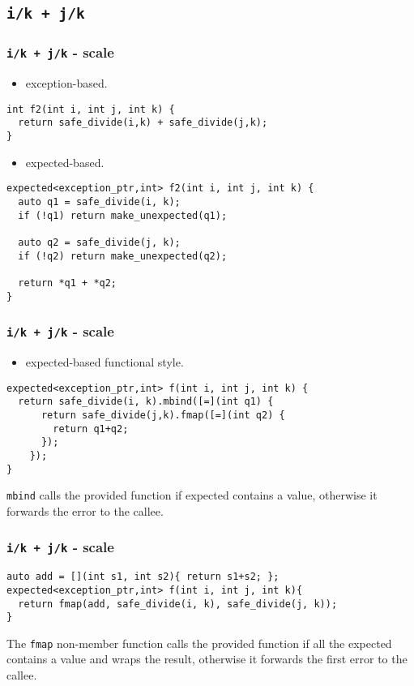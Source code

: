 \documentclass[xcolor=dvipsnames]{beamer}
\newcommand{\cpp}[1]{\lstinline{#1}}
\begin{document}
\subsection{\cpp{i/k + j/k}}
\begin{frame}[fragile]
\frametitle{\cpp{i/k + j/k}  - scale}

\begin{itemize}
  \item exception-based.
\end{itemize}

\begin{lstlisting}
int f2(int i, int j, int k) {
  return safe_divide(i,k) + safe_divide(j,k);
}
\end{lstlisting}

\begin{itemize}
  \item expected-based.
\end{itemize}

\begin{lstlisting}
expected<exception_ptr,int> f2(int i, int j, int k) {
  auto q1 = safe_divide(i, k);
  if (!q1) return make_unexpected(q1);

  auto q2 = safe_divide(j, k);
  if (!q2) return make_unexpected(q2);

  return *q1 + *q2;
}
\end{lstlisting}

\end{frame}
\begin{frame}[fragile]
\frametitle{\cpp{i/k + j/k}  - scale}

\begin{itemize}
  \item expected-based functional style.
\end{itemize}

\begin{lstlisting}
expected<exception_ptr,int> f(int i, int j, int k) {
  return safe_divide(i, k).mbind([=](int q1) {
      return safe_divide(j,k).fmap([=](int q2) {
        return q1+q2;
      });
    });
}
\end{lstlisting}

\cpp{mbind} calls the provided function if expected contains a value, otherwise it forwards the error to the callee. 

\end{frame}
\begin{frame}[fragile]
\frametitle{\cpp{i/k + j/k}  - scale}

\begin{lstlisting}
auto add = [](int s1, int s2){ return s1+s2; };
expected<exception_ptr,int> f(int i, int j, int k){
  return fmap(add, safe_divide(i, k), safe_divide(j, k));
}
\end{lstlisting}

The \cpp{fmap} non-member function calls the provided function if all the expected contains a value and wraps the result, otherwise it forwards the first error to the callee. 

\end{frame}
\end{document}
